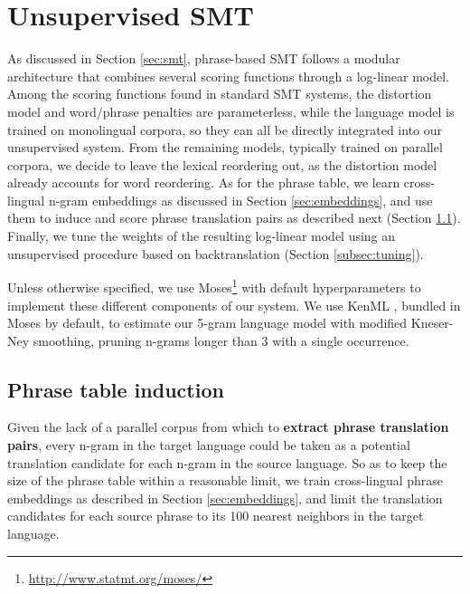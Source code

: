 \documentclass[11pt,a4paper]{article}
\begin{document}
\section{Unsupervised SMT} \label{sec:system}

As discussed in Section \ref{sec:smt}, phrase-based SMT follows a modular architecture that combines several scoring functions through a log-linear model. Among the scoring functions found in standard SMT systems, the distortion model and word/phrase penalties are parameterless, while the language model is trained on monolingual corpora, so they can all be directly integrated into our unsupervised system. From the remaining models, typically trained on parallel corpora, we decide to leave the lexical reordering out, as the distortion model already accounts for word reordering. As for the phrase table, we learn cross-lingual n-gram embeddings as discussed in Section \ref{sec:embeddings}, and use them to induce and score phrase translation pairs as described next (Section \ref{subsec:phrase_table_induction}). Finally, we tune the weights of the resulting log-linear model using an unsupervised procedure based on backtranslation (Section \ref{subsec:tuning}).

Unless otherwise specified, we use Moses\footnote{\url{http://www.statmt.org/moses/}} with default hyperparameters to implement these different components of our system. We use KenML \citep{heafield2013scalable}, bundled in Moses by default, to estimate our 5-gram language model with modified Kneser-Ney smoothing, pruning n-grams longer than 3 with a single occurrence.


\subsection{Phrase table induction} \label{subsec:phrase_table_induction}

Given the lack of a parallel corpus from which to \textbf{extract phrase translation pairs}, every n-gram in the target language could be taken as a potential translation candidate for each n-gram in the source language. So as to keep the size of the phrase table within a reasonable limit, we train cross-lingual phrase embeddings as described in Section \ref{sec:embeddings}, and limit the translation candidates for each source phrase to its 100 nearest neighbors in the target language.
\end{document}
